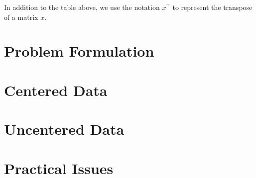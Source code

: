 \documentclass{article}
\begin{document}
In addition to the table above, we use the notation $x^\top$ to represent the transpose of a matrix $x$.

\section{Problem Formulation}
\label{sec:problem}


\section{Centered Data}
\label{sec:centered}


\section{Uncentered Data}
\label{sec:uncentered}


\section{Practical Issues}
\label{sec:practical}


\newpage



\end{document}
